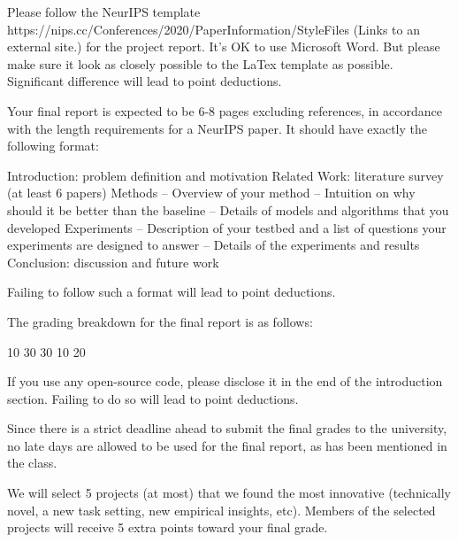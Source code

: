 Please follow the NeurIPS template https://nips.cc/Conferences/2020/PaperInformation/StyleFiles (Links to an external site.) for the project report. It's OK to use Microsoft Word. But please make sure it look as closely possible to the LaTex template as possible. Significant difference will lead to point deductions.

Your final report is expected to be 6-8 pages excluding references, in accordance with the length requirements for a NeurIPS paper. It should have exactly the following format:

    Introduction: problem definition and motivation
    Related Work: literature survey (at least 6 papers)
    Methods – Overview of your method – Intuition on why should it be better than the baseline – Details of models and algorithms that you developed
    Experiments – Description of your testbed and a list of questions your experiments are designed to answer – Details of the experiments and results
    Conclusion: discussion and future work

Failing to follow such a format will lead to point deductions.

The grading breakdown for the final report is as follows:

    10%
    30%
    30%
    10%
    20%

If you use any open-source code, please disclose it in the end of the introduction section. Failing to do so will lead to point deductions.

Since there is a strict deadline ahead to submit the final grades to the university, no late days are allowed to be used for the final report, as has been mentioned in the class.

We will select 5 projects (at most) that we found the most innovative (technically novel, a new task setting, new empirical insights, etc). Members of the selected projects will receive 5 extra points toward your final grade.